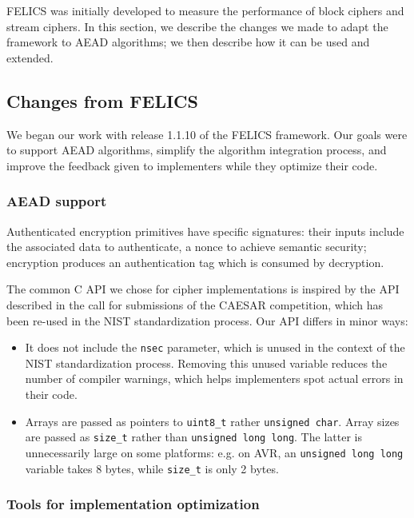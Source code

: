 \documentclass{article}
\begin{document}
FELICS was initially developed to measure the performance of block
ciphers and stream ciphers.  In this section, we describe the changes
we made to adapt the framework to AEAD algorithms; we then describe
how it can be used and extended.

\subsection{Changes from FELICS}
\label{sec:felics-ae/diff-felics}

We began our work with release 1.1.10 of the FELICS framework.  Our
goals were to support AEAD algorithms, simplify the algorithm
integration process, and improve the feedback given to implementers
while they optimize their code.

\subsubsection{AEAD support}
\label{sec:felics-ae/aead-support}

Authenticated encryption primitives have specific signatures: their
inputs include the associated data to authenticate, a nonce to achieve
semantic security\cite{Rogaway:AEAD}; encryption produces an
authentication tag which is consumed by decryption.

The common C API we chose for cipher implementations is inspired by
the API described in the call for submissions of the CAESAR
competition\cite{CAESAR:call}, which has been re-used in the NIST
standardization process\cite{NIST:LWC-requirements}.  Our API differs
in minor ways:

\begin{itemize}
\item It does not include the \texttt{nsec} parameter, which is unused
  in the context of the NIST standardization process.  Removing this
  unused variable reduces the number of compiler warnings, which helps
  implementers spot actual errors in their code.
\item Arrays are passed as pointers to \texttt{uint8\_t} rather
  \texttt{unsigned char}.  Array sizes are passed as \texttt{size\_t}
  rather than \texttt{unsigned long long}.  The latter is
  unnecessarily large on some platforms: e.g. on AVR, an
  \texttt{unsigned long long} variable takes 8 bytes, while
  \texttt{size\_t} is only 2 bytes.
\end{itemize}

\subsubsection{Tools for implementation optimization}
\label{sec:felics-ae/tools-opt}
\end{document}
